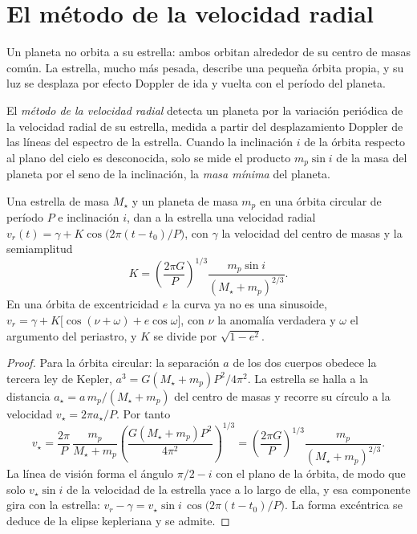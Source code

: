 \section{El método de la velocidad radial}\label{sec:b3:exoplanets:rv}

Un planeta no orbita a su estrella: ambos orbitan alrededor de su centro de masas común.
La estrella, mucho más pesada, describe una pequeña órbita propia, y su luz
se desplaza por efecto Doppler de ida y vuelta con el período del planeta.

\begin{definition}\label{def:b3:exoplanets:rv}
El \emph{método de la velocidad radial} detecta un
planeta por la variación periódica de la velocidad radial de su estrella,
medida a partir del desplazamiento Doppler de las líneas del espectro de la estrella. Cuando
la inclinación $i$ de la órbita respecto al plano del cielo es desconocida, solo
se mide el producto $m_p\sin i$ de la masa del planeta por el seno de
la inclinación, la \emph{masa mínima} del
planeta.
\end{definition}

\begin{theorem}\label{thm:b3:exoplanets:semi-amplitude}
Una estrella de masa $M_\star$ y un planeta de masa $m_p$ en una órbita circular de
período $P$ e inclinación $i$, dan a la estrella una velocidad radial
$v_r(t) = \gamma + K\cos\bigl(2\pi(t - t_0)/P\bigr)$, con $\gamma$ la
velocidad del centro de masas y la semiamplitud
\[
K = \left(\frac{2\pi G}{P}\right)^{1/3}
    \frac{m_p\sin i}{(M_\star + m_p)^{2/3}} .
\]
En una órbita de excentricidad $e$ la curva ya no es una sinusoide,
$v_r = \gamma + K\bigl[\cos(\nu + \omega) + e\cos\omega\bigr]$, con $\nu$
la anomalía verdadera y $\omega$ el argumento del periastro, y $K$ se
divide por $\sqrt{1 - e^2}$.
\end{theorem}

\begin{proof}
Para la órbita circular: la separación $a$ de los dos cuerpos obedece
la tercera ley de Kepler, $a^3 = G(M_\star + m_p)P^2/4\pi^2$. La estrella se halla a
la distancia $a_\star = a\,m_p/(M_\star + m_p)$ del centro de masas
y recorre su círculo a la velocidad $v_\star = 2\pi a_\star/P$. Por tanto
\[
v_\star = \frac{2\pi}{P}\,\frac{m_p}{M_\star + m_p}
          \left(\frac{G(M_\star + m_p)P^2}{4\pi^2}\right)^{1/3}
        = \left(\frac{2\pi G}{P}\right)^{1/3}\frac{m_p}{(M_\star + m_p)^{2/3}} .
\]
La línea de visión forma el ángulo $\pi/2 - i$ con el plano de la
órbita, de modo que solo $v_\star\sin i$ de la velocidad de la estrella yace a lo largo de ella, y
esa componente gira con la estrella: $v_r - \gamma = v_\star\sin i\,
\cos\bigl(2\pi(t - t_0)/P\bigr)$. La forma excéntrica se deduce de la
elipse kepleriana y se admite.
\end{proof}

